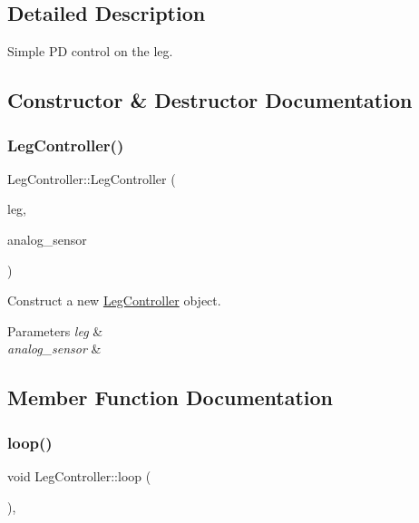 \subsection{Detailed Description}
Simple PD control on the leg. 

\subsection{Constructor \& Destructor Documentation}
\mbox{\label{classLegController_a9d1253c4c70fe6b83e449830c7328b58}} 
\subsubsection{\texorpdfstring{Leg\+Controller()}{LegController()}}
{\footnotesize\ttfamily Leg\+Controller\+::\+Leg\+Controller (\begin{DoxyParamCaption}\item[{std\+::shared\+\_\+ptr$<$ \hyperlink{classblmc__drivers_1_1Leg}{blmc\+\_\+drivers\+::\+Leg} $>$}]{leg,  }\item[{std\+::shared\+\_\+ptr$<$ \hyperlink{classblmc__drivers_1_1AnalogSensor}{blmc\+\_\+drivers\+::\+Analog\+Sensor} $>$}]{analog\+\_\+sensor }\end{DoxyParamCaption})\hspace{0.3cm}{\ttfamily [inline]}}



Construct a new \hyperlink{classLegController}{Leg\+Controller} object. 


\begin{DoxyParams}{Parameters}
{\em leg} & \\
\hline
{\em analog\+\_\+sensor} & \\
\hline
\end{DoxyParams}


\subsection{Member Function Documentation}
\mbox{\label{classLegController_a00000dd7bbaa4f1e05a9ea16f05e73e8}} 
\subsubsection{\texorpdfstring{loop()}{loop()}}
{\footnotesize\ttfamily void Leg\+Controller\+::loop (\begin{DoxyParamCaption}{ }\end{DoxyParamCaption})\hspace{0.3cm}{\ttfamily [inline]}, {\ttfamily [private]}}



